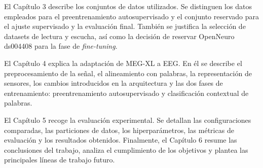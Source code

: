 El Capítulo 3 describe los conjuntos de datos utilizados. Se distinguen los datos empleados para el preentrenamiento autosupervisado y el conjunto reservado para el ajuste supervisado y la evaluación final. También se justifica la selección de datasets de lectura y escucha, así como la decisión de reservar OpenNeuro ds004408 para la fase de \textit{fine-tuning}.

El Capítulo 4 explica la adaptación de MEG-XL a EEG. En él se describe el preprocesamiento de la señal, el alineamiento con palabras, la representación de sensores, los cambios introducidos en la arquitectura y las dos fases de entrenamiento: preentrenamiento autosupervisado y clasificación contextual de palabras.

El Capítulo 5 recoge la evaluación experimental. Se detallan las configuraciones comparadas, las particiones de datos, los hiperparámetros, las métricas de evaluación y los resultados obtenidos. Finalmente, el Capítulo 6 resume las conclusiones del trabajo, analiza el cumplimiento de los objetivos y plantea las principales líneas de trabajo futuro.